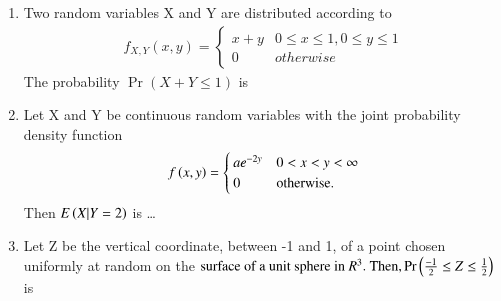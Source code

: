 \begin{enumerate}[label=\thesection.\arabic*.,ref=\thesection.\theenumi]
\item Two random variables X and Y are distributed according to
\begin{align}
 f_{X,Y}(x,y)=\begin{cases} 
      x+y & 0\leq x\leq 1, 0\leq y\leq 1 \\
      0 & otherwise
  \end{cases}
\end{align}
The probability $\Pr(X+Y\leq 1)$ is 
%
\solution

%
\item Let X and Y be continuous random variables with the joint probability density function 
\begin{align}
f\left(x,y\right)= 
\begin{cases}
ae^{-2y} & 0<x<y<\infty \\
0 & \text{otherwise}.
\end{cases}   
\end{align}
Then $E\left(X|Y=2\right)$ is \dots
\solution

%
\item Let Z be the vertical coordinate, between -1 and 1, of a point chosen uniformly at random on the
\begin{math}
\text{surface of a unit sphere in }R^3.\text{ Then,} \Pr\left(\frac{-1}{2} \leq Z \leq \frac{1}{2}\right)
\end{math}
is
\\
  \solution
  


\end{enumerate}
